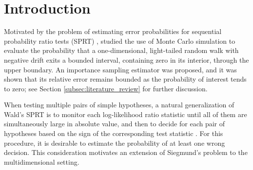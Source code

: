 \documentclass[aap,preprint]{imsart}
\theoremstyle{plain}
\theoremstyle{definition}
\begin{document}
\begin{frontmatter}
\begin{keyword}[class=MSC]
\end{keyword}
%
\begin{keyword}
\end{keyword}


\end{frontmatter}

\tableofcontents

\section{Introduction} 
Motivated by the problem of estimating error probabilities for sequential probability ratio tests (SPRT) \citep{alma993552393405158}, \citet{siegmund1976importance} studied the use of Monte Carlo simulation to evaluate the probability that a one-dimensional, light-tailed random walk with negative drift exits a bounded interval, containing zero in its interior, through the upper boundary. An importance sampling estimator was proposed, and it was shown that its relative error remains bounded as the probability of interest tends to zero; see Section \ref{subsec:literature_review} for further discussion.



When testing multiple pairs of simple hypotheses, a natural generalization of Wald's SPRT is to monitor each log-likelihood ratio statistic until all of them are simultaneously large in absolute value, and then to decide for each pair of hypotheses based on the sign of the corresponding test statistic \citep{de2012sequential,song2017asymptotically}. For this procedure, it is desirable to estimate the probability of at least one wrong decision. This consideration motivates an extension of Siegmund's problem to the multidimensional setting.
\end{document}
